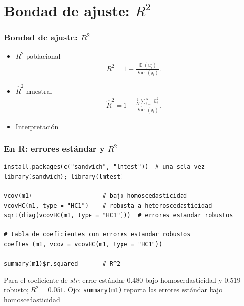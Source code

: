 \documentclass[t, compress, spanish, aspectratio=169]{beamer}
\DeclareMathOperator{\plim}{plim}
\DeclareMathOperator{\Var}{Var}
\DeclareMathOperator{\E}{\mathbb{E}}
\begin{document}
	\section{Bondad de ajuste: $R^2$}
	\begin{frame}
		\frametitle{Bondad de ajuste: $R^2$}
		\begin{itemize}
			\item  $R^2$ poblacional
			\begin{align*}
				R^2=1-\frac{\E(u_i^2)}{\Var(y_i)}.
			\end{align*}
			\item  $\widehat{R}^2$ muestral
			\begin{align*}
				\widehat{R}^2=1-\frac{\frac{1}{N}\sum_{i=1}^{N} \hat u_i^2}{\widehat{\Var}(y_i)}.
			\end{align*}
			\item []Interpretaci\'on
		\end{itemize}
	\end{frame}
\begin{frame}[fragile]
	\frametitle{En R: errores est\'andar y $R^2$}
\footnotesize
\begin{verbatim}
install.packages(c("sandwich", "lmtest"))  # una sola vez
library(sandwich); library(lmtest)

vcov(m1)                    # bajo homoscedasticidad
vcovHC(m1, type = "HC1")    # robusta a heteroscedasticidad
sqrt(diag(vcovHC(m1, type = "HC1")))  # errores estandar robustos

# tabla de coeficientes con errores estandar robustos
coeftest(m1, vcov = vcovHC(m1, type = "HC1"))

summary(m1)$r.squared       # R^2
\end{verbatim}
\small
Para el coeficiente de \emph{str}: error est\'andar $0.480$ bajo homoscedasticidad y $0.519$ robusto; $R^2=0.051$. Ojo: \texttt{summary(m1)} reporta los errores est\'andar bajo homoscedasticidad.
\end{frame}
\end{document}
